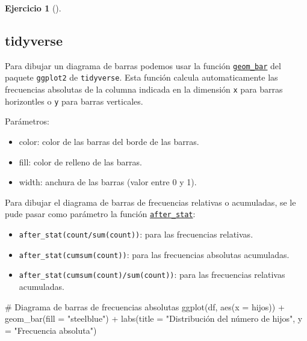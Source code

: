 \documentclass[
  spanish,
  a4paper,
]{scrreport}
\newenvironment{Shaded}{\begin{snugshade}}{\end{snugshade}}
\newcommand{\AttributeTok}[1]{\textcolor[rgb]{0.40,0.45,0.13}{#1}}
\newcommand{\CommentTok}[1]{\textcolor[rgb]{0.37,0.37,0.37}{#1}}
\newcommand{\FunctionTok}[1]{\textcolor[rgb]{0.28,0.35,0.67}{#1}}
\newcommand{\NormalTok}[1]{\textcolor[rgb]{0.00,0.23,0.31}{#1}}
\newcommand{\SpecialCharTok}[1]{\textcolor[rgb]{0.37,0.37,0.37}{#1}}
\newcommand{\StringTok}[1]{\textcolor[rgb]{0.13,0.47,0.30}{#1}}
\providecommand{\tightlist}{%
  \setlength{\itemsep}{0pt}\setlength{\parskip}{0pt}}
\theoremstyle{definition}
\newtheorem{exercise}{Ejercicio}[chapter]
\theoremstyle{remark}
\begin{document}
\begin{exercise}[]
\begin{enumerate}
\begin{tcolorbox}
  \section{tidyverse}

  Para dibujar un diagrama de barras podemos usar la función
  \href{https://aprendeconalf.es/manual-r/07-graficos.html\#diagramas-de-barras}{\texttt{geom\_bar}}
  del paquete \texttt{ggplot2} de \texttt{tidyverse}. Esta función
  calcula automaticamente las frecuencias absolutas de la columna
  indicada en la dimensión \texttt{x} para barras horizontles o
  \texttt{y} para barras verticales.

  Parámetros:

  \begin{itemize}
  \tightlist
  \item
    color: color de las barras del borde de las barras.
  \item
    fill: color de relleno de las barras.
  \item
    width: anchura de las barras (valor entre 0 y 1).
  \end{itemize}

  Para dibujar el diagrama de barras de frecuencias relativas o
  acumuladas, se le pude pasar como parámetro la función
  \href{https://ggplot2.tidyverse.org/reference/geom_bar.html}{\texttt{after\_stat}}:

  \begin{itemize}
  \tightlist
  \item
    \texttt{after\_stat(count/sum(count))}: para las frecuencias
    relativas.
  \item
    \texttt{after\_stat(cumsum(count))}: para las frecuencias absolutas
    acumuladas.
  \item
    \texttt{after\_stat(cumsum(count)/sum(count))}: para las frecuencias
    relativas acumuladas.
  \end{itemize}

\begin{Shaded}
\begin{Highlighting}[]
\CommentTok{\# Diagrama de barras de frecuencias absolutas}
\FunctionTok{ggplot}\NormalTok{(df, }\FunctionTok{aes}\NormalTok{(}\AttributeTok{x =}\NormalTok{ hijos)) }\SpecialCharTok{+}
    \FunctionTok{geom\_bar}\NormalTok{(}\AttributeTok{fill =} \StringTok{"steelblue"}\NormalTok{) }\SpecialCharTok{+} 
    \FunctionTok{labs}\NormalTok{(}\AttributeTok{title =} \StringTok{"Distribución del número de hijos"}\NormalTok{, }\AttributeTok{y =} \StringTok{"Frecuencia absoluta"}\NormalTok{)}
\end{Highlighting}
\end{Shaded}


\end{tcolorbox}
\end{enumerate}
\end{exercise}
\end{document}
